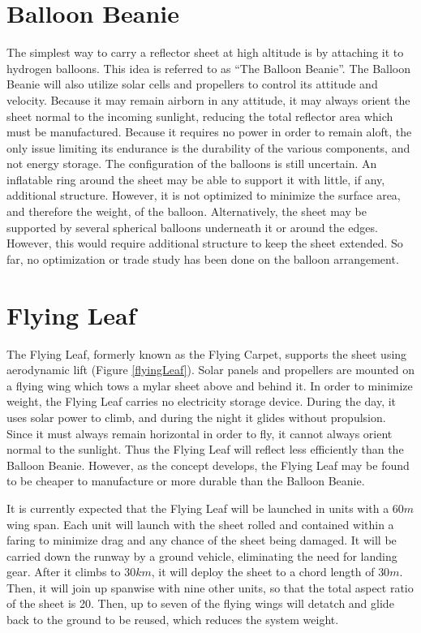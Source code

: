 \documentclass[12pt]{report} %
\begin{document}
\section{Balloon Beanie}
The simplest way to carry a reflector sheet at high altitude is by attaching it to hydrogen balloons. This idea is referred to as ``The Balloon
Beanie''. The Balloon Beanie will also utilize solar cells
and propellers to control its attitude and velocity. Because it may remain airborn in any attitude, it may always orient the sheet normal
to the incoming sunlight, reducing the total reflector area which must be manufactured. Because it requires no power in order to remain aloft,
the only issue limiting its endurance is the durability of the various components, and not energy storage. The configuration of the
balloons is still uncertain. An inflatable ring around the sheet may be able to support it with little, if any, additional structure. However,
it is not optimized to minimize the surface area, and therefore the weight, of the balloon. Alternatively, the sheet may be supported by
several spherical balloons underneath it or around the edges. However, this would require additional structure to keep the sheet extended.
So far, no optimization or trade study has been done on the balloon arrangement.

\section{Flying Leaf}
The Flying Leaf, formerly known as the Flying Carpet, supports the sheet using aerodynamic lift (Figure \ref{flyingLeaf}). Solar panels
and propellers are mounted
on a flying wing which tows a mylar sheet above and behind it. In order to minimize weight, the Flying Leaf carries no electricity storage
device. During the day, it uses solar power to climb, and during the night it glides without propulsion. Since it must always remain
horizontal in order to fly, it cannot always orient normal to the sunlight. Thus the Flying Leaf will reflect less efficiently than the Balloon
Beanie. However, as the concept develops, the Flying Leaf may be found to be cheaper to manufacture or more durable than the Balloon Beanie.

It is currently expected that the Flying Leaf will be launched in units with a $60 m$ wing span. Each unit will launch with the sheet rolled
and contained within a faring to minimize drag and any chance of the sheet being damaged. It will be carried down the runway by a ground
vehicle, eliminating the need for landing gear. After it climbs to $30 km$, it will deploy the sheet to a chord length of $30m$. Then, it
will join up spanwise with nine other units, so that the total aspect ratio of the sheet is 20. Then, up to seven of the flying wings will
detatch and glide back to the ground to be reused, which reduces the system weight.
\end{document}
